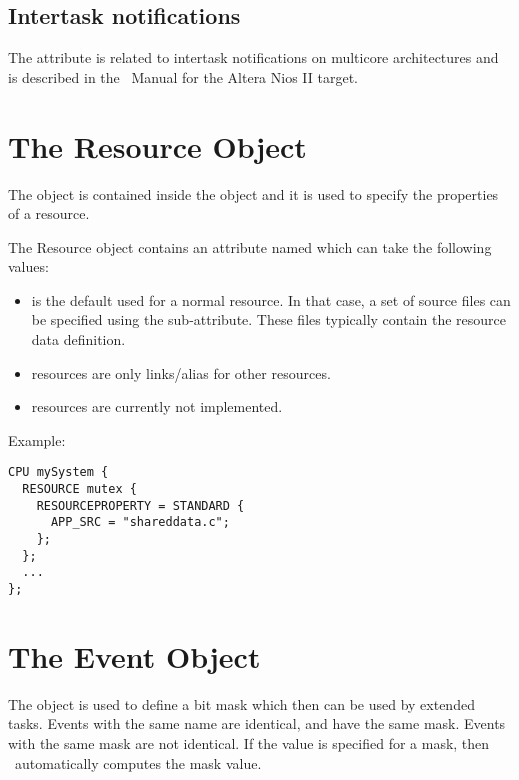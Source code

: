\subsection{Intertask notifications}
\label{sec:intertask-notifications}
The attribute  is related to intertask notifications on
multicore architectures and is described in the \ee\ Manual for the
Altera Nios II target.





\section{The Resource Object}

The  object is contained inside the  object
and it is used to specify the properties of a resource.

The Resource object contains an attribute named 
which can take the following values: 
\begin{itemize}
\item {} is the default used for a normal resource. In
  that case, a set of source files can be specified using the
   sub-attribute. These files typically contain the
  resource data definition.
\item {} resources are only links/alias for other
  resources.
\item {} resources are currently not implemented.
\end{itemize}

Example:

\begin{lstlisting}
CPU mySystem {
  RESOURCE mutex {
    RESOURCEPROPERTY = STANDARD {
      APP_SRC = "shareddata.c";
    };
  };
  ...
};
\end{lstlisting}

\section{The Event Object}
The  object is used to define a bit mask which
then can be used by extended tasks. Events with the same name are
identical, and have the same mask. Events with the same mask are not
identical. If the value  is specified for a mask, then
\rtd\ automatically computes the mask value.


